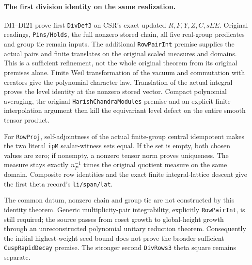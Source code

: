 \paragraph{The first division identity on the same realization.}
DI1--DI21 prove first \texttt{DivDef3} on CSR's exact updated
$R,F,Y,Z,C,sEE$. Original readings, \texttt{Pins/Holds}, the
full nonzero stored chain, all five real-group predicates and group tie
remain inputs. The additional \texttt{RowPairInt} premise
supplies the actual pairs and finite translates on the original
scaled measures and domains. This is a sufficient refinement,
not the whole original theorem from its original premises alone. Finite Weil transformation of the vacuum and
commutation with creators give the polynomial character law.
Translation of the actual integral proves the level identity
at the nonzero stored vector. Compact polynomial averaging,
the original \texttt{HarishChandraModules} premise and an
explicit finite interpolation argument then kill the equivariant
level defect on the entire smooth tensor product.

For \texttt{RowProj}, self-adjointness of the actual finite-group
central idempotent makes the two literal \texttt{ipM} scalar-witness
sets equal. If the set is empty, both chosen values are zero;
if nonempty, a nonzero tensor norm proves uniqueness. The measure
stays exactly $n_P^{-1}$ times the original quotient measure on
the same domain. Composite row identities and the exact finite
integral-lattice descent give the first theta record's
\texttt{li/span/lat}.

The common datum, nonzero chain and group tie are not constructed
by this identity theorem. Generic multiplicity-pair integrability, explicitly
\texttt{RowPairInt}, is still required; the source passes
from coset growth to global-height growth through an unreconstructed
polynomial unitary reduction theorem. Consequently the initial highest-weight seed bound does not
prove the broader sufficient \texttt{CuspRapidDecay} premise.
The stronger second \texttt{DivRows3} theta square remains separate.

